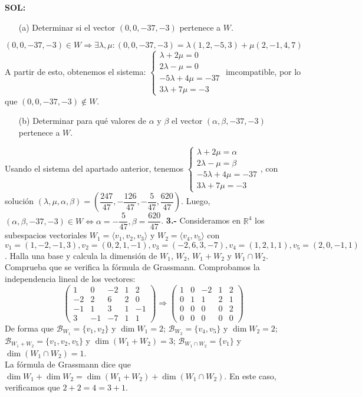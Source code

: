 \documentclass[11pt,a4paper]{article}
\newcommand{\R}{\mathbb R}
\begin{document}
{\bf SOL:}
\begin{itemize}\item[(a)]Determinar si el vector $(0,0,-37,-3)$ pertenece a $W$.\end{itemize}
$(0,0,-37,-3)\in W\Rightarrow \exists \lambda,\mu:(0,0,-37,-3)=\lambda(1,2,-5,3)+\mu(2,-1,4,7)$ A partir de esto, obtenemos el sistema: $\begin{cases}\lambda+2\mu=0\\2\lambda-\mu=0\\-5\lambda+4\mu=-37\\3\lambda+7\mu=-3 \end{cases}$ imcompatible, por lo que $(0,0,-37,-3)\not\in W$.\\
\begin{itemize}\item[(b)]Determinar para qué valores de $\alpha$ y $\beta$ el vector $(\alpha,\beta,-37,-3)$ pertenece a $W$.
\end{itemize}
Usando el sistema del apartado anterior, tenemos $\begin{cases}\lambda+2\mu=\alpha\\2\lambda-\mu=\beta\\-5\lambda+4\mu=-37\\3\lambda+7\mu=-3 \end{cases}$, con solución $(\lambda,\mu,\alpha,\beta)=\left(\dfrac{247}{47},-\dfrac{126}{47},-\dfrac{5}{47},\dfrac{620}{47}\right)$. Luego, $(\alpha,\beta,-37,-3)\in W\Leftrightarrow \alpha =-\dfrac{5}{47},\beta=\dfrac{620}{47}$.
\vskip 5mm
{\bf 3.-} Consideramos en $\R^4$ los subespacios vectoriales $W_1=\langle v_1,v_2,v_3\rangle$ y $W_2=\langle v_4,v_5\rangle$ con $v_1=(1,-2,-1,3),v_2=(0,2,1,-1),v_3=(-2,6,3,-7),v_4=(1,2,1,1),v_5=(2,0,-1,1)$. Halla una base y calcula la dimensión de $W_1$, $W_2$, $W_1+W_2$ y $W_1\cap W_2$. Comprueba que se verifica la fórmula de Grassmann.
\vskip 1mm
Comprobamos la independencia lineal de los vectores:
\[
\begin{pmatrix}
1&0&-2&1&2\\
-2&2&6&2&0\\
-1&1&3&1&-1\\
3&-1&-7&1&1
\end{pmatrix}\Rightarrow\begin{pmatrix}
1&0&-2&1&2\\
0&1&1&2&1\\
0&0&0&0&2\\
0&0&0&0&0
\end{pmatrix}
\]
De forma que $\mathcal B_{W_1}=\{v_1,v_2\}$ y $\dim W_1=2$; $\mathcal B_{W_2}=\{v_4,v_5\}$ y $\dim W_2=2$; $\mathcal B_{W_1+W_2}=\{v_1,v_2,v_5\}$ y $\dim (W_1+W_2)= 3$; $\mathcal B_{W_1\cap W_2}=\{v_1\}$ y $\dim (W_1\cap W_2)=1$.\\
La fórmula de Grassmann dice que $\dim W_1 + \dim W_2 = \dim (W_1+W_2) + \dim (W_1\cap W_2)$. En este caso, verificamos que $2+2=4=3+1$.
\vskip 5mm
\end{document}
